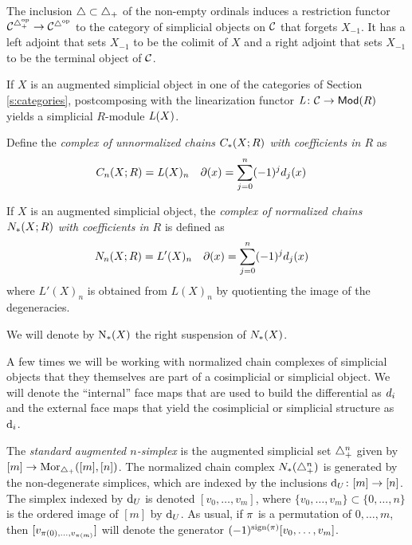 The inclusion $\simplex \subset \asimplex$ of the non-empty ordinals induces a restriction functor $\cC^{\asimplex^{\op}} \to \cC^{\simplex^{\op}}$ to the category of simplicial objects on $\cC$ that forgets $X_{-1}$. It has a left adjoint that sets $X_{-1}$ to be the colimit of $X$ and a right adjoint that sets $X_{-1}$ to be the terminal object of $\cC$.

If $X$ is an augmented simplicial object in one of the categories of Section \ref{s:categories}, postcomposing with the linearization functor $\abel \colon \cC \to \Mod{R}$ yields a simplicial $R$-module $\abel(X)$.

Define the \emph{complex of unnormalized chains $\ucadenas(X;R)$ with coefficients in $R$} as
\begin{align*}
	\ucadenas[n](X;R) &= \abel(X)_n
	&
	\partial(x) &= \sum_{j=0}^{n} (-1)^jd_j(x)
\end{align*}

If $X$ is an augmented simplicial object, the \emph{complex of normalized chains $\cadenas(X;R)$ with coefficients in $R$} is defined as
\begin{align*}
	\cadenas[n](X;R) &= L'(X)_n
	&
	\partial(x) &= \sum_{j=0}^{n} (-1)^jd_j(x)
\end{align*}
where $L'(X)_n$ is obtained from $L(X)_n$ by quotienting the image of the degeneracies.

\begin{notation}\label{notation:chains}
	We will denote by $\chains(X)$ the right suspension of $\cadenas(X)$.
\end{notation}

\begin{notation}
	A few times we will be working with normalized chain complexes of simplicial objects that they themselves are part of a cosimplicial or simplicial object. We will denote the ``internal'' face maps that are used to build the differential as $\diff_i$ and the external face maps that yield the cosimplicial or simplicial structure as $\d_i$.
\end{notation}

The \emph{standard augmented $n$-simplex} is the augmented simplicial set $\simplex^n_+$ given by $[m] \to \mathrm{Mor}_{\asimplex}([m],[n])$. The normalized chain complex $\cadenas(\asimplex^n)$ is generated by the non-degenerate simplices, which are indexed by the inclusions $\d_U \colon [m] \to [n]$. The simplex indexed by $\d_U$ is denoted $[v_0,\dots,v_{m}]$, where $\{v_0,\dots,v_{m}\} \subset \{0,\dots,n\}$ is the ordered image of $[m]$ by $\d_U$. As usual, if $\perm$ is a permutation of $0,\dots,m$, then $[v_{\perm(0),\dots,v_{\perm(m)}}]$ will denote the generator $(-1)^{\sign{\perm}}[v_0,\dots,v_m]$.

